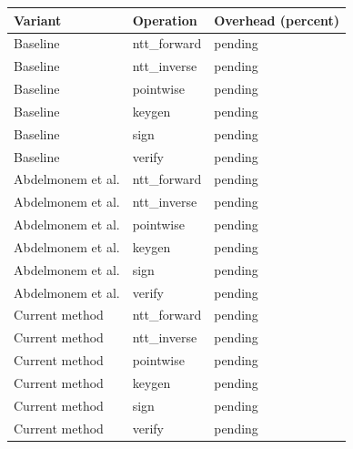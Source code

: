 \begin{tabular}{lll}
\hline
Variant & Operation & Overhead (percent) \\
\hline
Baseline & ntt\_forward & pending \\
Baseline & ntt\_inverse & pending \\
Baseline & pointwise & pending \\
Baseline & keygen & pending \\
Baseline & sign & pending \\
Baseline & verify & pending \\
Abdelmonem et al. & ntt\_forward & pending \\
Abdelmonem et al. & ntt\_inverse & pending \\
Abdelmonem et al. & pointwise & pending \\
Abdelmonem et al. & keygen & pending \\
Abdelmonem et al. & sign & pending \\
Abdelmonem et al. & verify & pending \\
Current method & ntt\_forward & pending \\
Current method & ntt\_inverse & pending \\
Current method & pointwise & pending \\
Current method & keygen & pending \\
Current method & sign & pending \\
Current method & verify & pending \\
\hline
\end{tabular}
